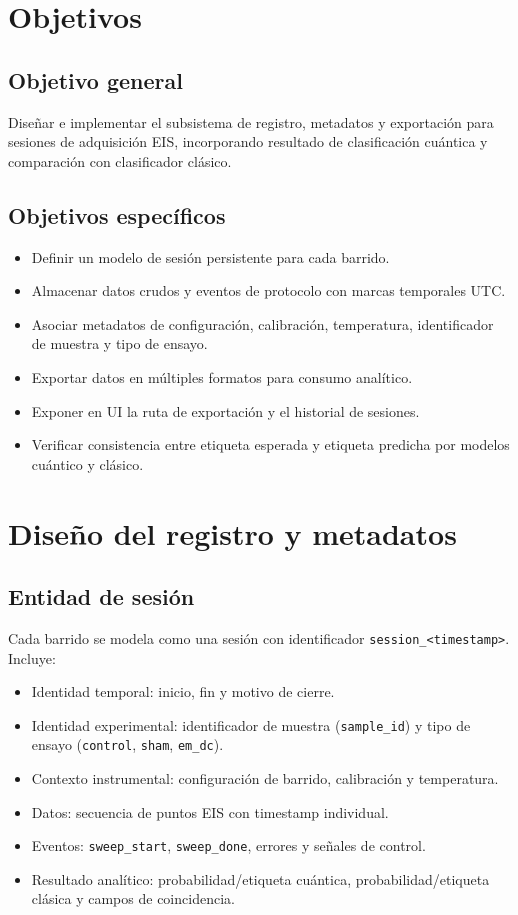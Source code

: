 \documentclass[11pt,a4paper,spanish]{book}
\begin{document}
\chapter{Objetivos}

\section{Objetivo general}
Dise\~{n}ar e implementar el subsistema de registro, metadatos y exportaci\'{o}n para sesiones de adquisici\'{o}n EIS, incorporando resultado de clasificaci\'{o}n cu\'{a}ntica y comparaci\'{o}n con clasificador cl\'{a}sico.

\section{Objetivos espec\'{i}ficos}
\begin{itemize}
	\item Definir un modelo de sesi\'{o}n persistente para cada barrido.
	\item Almacenar datos crudos y eventos de protocolo con marcas temporales UTC.
	\item Asociar metadatos de configuraci\'{o}n, calibraci\'{o}n, temperatura, identificador de muestra y tipo de ensayo.
	\item Exportar datos en m\'{u}ltiples formatos para consumo anal\'{i}tico.
	\item Exponer en UI la ruta de exportaci\'{o}n y el historial de sesiones.
	\item Verificar consistencia entre etiqueta esperada y etiqueta predicha por modelos cu\'{a}ntico y cl\'{a}sico.
\end{itemize}


\chapter{Dise\~{n}o del registro y metadatos}

\section{Entidad de sesi\'{o}n}

Cada barrido se modela como una sesi\'{o}n con identificador \texttt{session\_<timestamp>}. Incluye:
\begin{itemize}
	\item Identidad temporal: inicio, fin y motivo de cierre.
	\item Identidad experimental: identificador de muestra (\texttt{sample\_id}) y tipo de ensayo (\texttt{control}, \texttt{sham}, \texttt{em\_dc}).
	\item Contexto instrumental: configuraci\'{o}n de barrido, calibraci\'{o}n y temperatura.
	\item Datos: secuencia de puntos EIS con timestamp individual.
	\item Eventos: \texttt{sweep\_start}, \texttt{sweep\_done}, errores y se\~{n}ales de control.
	\item Resultado anal\'{i}tico: probabilidad/etiqueta cu\'{a}ntica, probabilidad/etiqueta cl\'{a}sica y campos de coincidencia.
\end{itemize}
\end{document}

